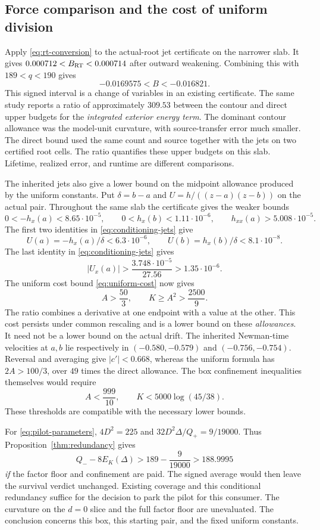 \subsection{Force comparison and the cost of uniform division}

Apply \eqref{eq:rt-conversion} to the actual-root jet certificate
on the narrower slab. It gives
\(0.000712<B_{\rm RT}<0.000714\) after outward weakening. Combining
this with \(189<q<190\) gives
\[
 -0.0169575<B<-0.016821 .
\]
This signed interval is a change of variables in an existing
certificate. The same study reports a ratio of approximately \(309.53\)
between the contour and direct upper budgets for the \emph{integrated
exterior energy term}. The dominant contour allowance was the
model-unit curvature, with source-transfer error much smaller.
The direct bound used the same count and source together with the
jets on two certified root cells. The ratio quantifies these upper
budgets on this slab. Lifetime, realized error, and runtime are
different comparisons. \cite{RTTransfer,RTPilot}

The inherited jets also give a lower bound on the midpoint allowance
produced by the uniform constants. Put \(\delta=b-a\) and
\(U=h/((z-a)(z-b))\) on the actual pair. Throughout the same slab
the certificate gives the weaker bounds
\[
 0<-h_x(a)<8.65\cdot10^{-5},\qquad
 0<h_x(b)<1.11\cdot10^{-6},\qquad
 h_{xx}(a)>5.008\cdot10^{-5}.
\]
The first two identities in \eqref{eq:conditioning-jets} give
\[
 U(a)=-h_x(a)/\delta<6.3\cdot10^{-6},
 \qquad U(b)=h_x(b)/\delta<8.1\cdot10^{-8}.
\]
The last identity in \eqref{eq:conditioning-jets} gives
\[
 |U_x(a)|>\frac{3.748\cdot10^{-5}}{27.56}>1.35\cdot10^{-6}.
\]
The uniform cost bound \eqref{eq:uniform-cost} now gives
\[
 A>\frac{50}{3},\qquad K\ge A^2>\frac{2500}{9}.
\]
The ratio combines a derivative at one endpoint with a value at
the other. This cost persists under common rescaling and is a lower
bound on these \emph{allowances}. It need not be a lower bound on the
actual drift. The inherited Newman-time velocities at \(a,b\) lie
respectively in \((-0.580,-0.579)\) and \((-0.756,-0.754)\).
Reversal and averaging give \(\lvert c'\rvert<0.668\), whereas the
uniform formula has \(2A>100/3\), over \(49\) times the direct
allowance. The box confinement inequalities themselves would require
\[
 A<\frac{999}{10},\qquad K<5000\log(45/38).
\]
These thresholds are compatible with the necessary lower bounds.

For \eqref{eq:pilot-parameters}, \(4D^2=225\) and
\(32D^2\Delta/Q_+=9/19000\). Thus Proposition~\ref{thm:redundancy} gives
\[
 Q_- - 8E_K(\Delta)>189-\frac9{19000}>188.9995
\]
\emph{if} the factor floor and confinement are paid. The signed
average would then leave the survival verdict unchanged. Existing
coverage and this conditional redundancy suffice for the decision
to park the pilot for this consumer. The curvature on the \(d=0\)
slice and the full factor floor are unevaluated. The conclusion
concerns this box, this starting pair, and the fixed uniform constants.

